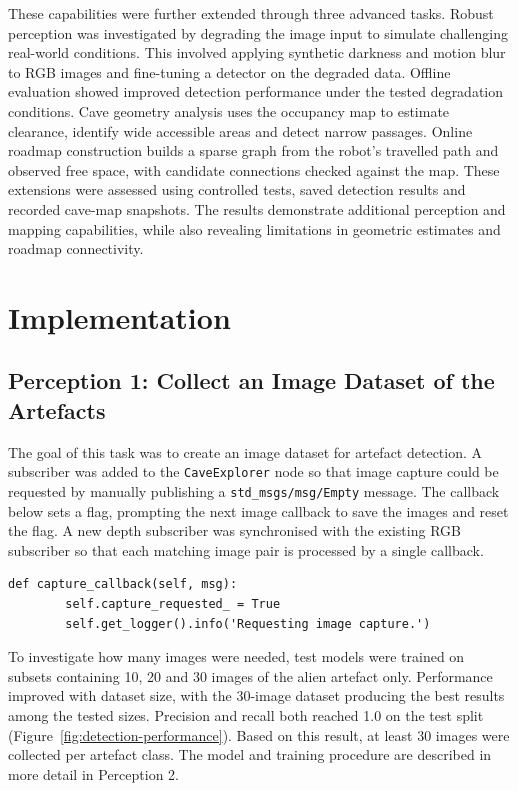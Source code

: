 \documentclass[a4paper,11pt]{article}
\begin{document}
These capabilities were further extended through three advanced tasks.
Robust perception was investigated by degrading the image input to simulate
challenging real-world conditions. This involved applying synthetic darkness
and motion blur to RGB images and fine-tuning a detector on the degraded data.
Offline evaluation showed improved detection performance under the tested
degradation conditions. Cave geometry analysis uses the occupancy map to
estimate clearance, identify wide accessible areas and detect narrow passages.
Online roadmap construction builds a sparse graph from the robot's travelled
path and observed free space, with candidate connections checked against the
map. These extensions were assessed using controlled tests, saved detection
results and recorded cave-map snapshots. The results demonstrate additional
perception and mapping capabilities, while also revealing limitations in
geometric estimates and roadmap connectivity.

\newpage

\section{Implementation}

\subsection{Perception 1: Collect an Image Dataset of the Artefacts}
The goal of this task was to create an image dataset for artefact detection.
A subscriber was added to the \texttt{CaveExplorer} node so that image capture
could be requested by manually publishing a \texttt{std\_\allowbreak msgs/msg/Empty}
message. The callback below sets a flag, prompting the next image callback to
save the images and reset the flag. A new depth subscriber was synchronised with the existing RGB
subscriber so that each matching image pair is processed by a single callback.


\begin{lstlisting}[caption={Implementation of capture callback}, label={lst:task1}]
    def capture_callback(self, msg):
        self.capture_requested_ = True
        self.get_logger().info('Requesting image capture.')
\end{lstlisting}

To investigate how many images were needed, test models were trained on
subsets containing 10, 20 and 30 images of the alien artefact only.
Performance improved with dataset size, with the 30-image dataset producing
the best results among the tested sizes. Precision and recall both reached
1.0 on the test split (Figure~\ref{fig:detection-performance}). Based on this result, at least
30 images were collected per artefact class. The model and training procedure
are described in more detail in Perception 2.
\end{document}
